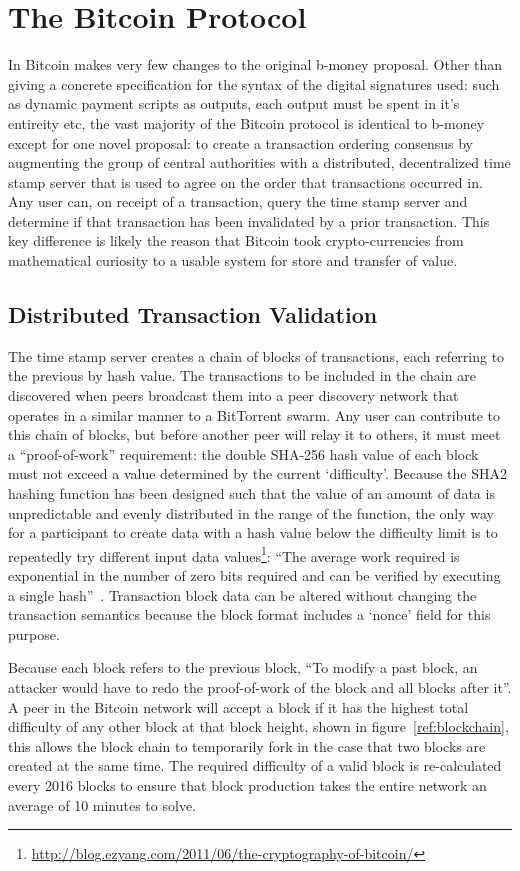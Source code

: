 \section{The Bitcoin Protocol}
In Bitcoin \textcite{satoshi} makes very few changes to the original b-money\cite{b-money} proposal. Other than giving a concrete specification for the syntax of the digital signatures  used: such as dynamic payment scripts as outputs, each output must be spent in it's entireity etc, the vast majority of the Bitcoin protocol is identical to b-money except for one novel proposal: to create a transaction ordering consensus by augmenting the group of central authorities with a distributed, decentralized time stamp server that is used to agree on the order that transactions occurred in.  Any user can, on receipt of a transaction, query the time stamp server and determine if that transaction has been invalidated by a prior transaction. This key difference is likely the reason that Bitcoin took crypto-currencies from mathematical curiosity to a usable system for store and transfer of value.

\subsection{Distributed Transaction Validation}
The time stamp server creates a chain of blocks of transactions, each referring to the previous by hash value.  The transactions to be included in the chain are discovered when peers broadcast them into a peer discovery network that operates in a similar manner to a BitTorrent swarm.  Any user can contribute to this chain of blocks, but before another peer will relay it to others, it must meet a ``proof-of-work'' requirement: the double SHA-256 hash value of each block must not exceed a value determined by the current `difficulty'.  Because the SHA2 hashing function has been designed such that the value of an amount of data is unpredictable and evenly distributed in the range of the function, the only way for a participant to create data with a hash value below the difficulty limit is to repeatedly try different input data values\footnote{\url{http://blog.ezyang.com/2011/06/the-cryptography-of-bitcoin/}}: ``The average work required is exponential in the number of zero bits required and can be verified by executing a single hash''~\cite{satoshi}. Transaction block data can be altered without changing the transaction semantics because the block format includes a `nonce' field for this purpose.

Because each block refers to the previous block, ``To modify a past block, an attacker would have to redo the proof-of-work of the block and all blocks after it''.  A peer in the Bitcoin network will accept a block if it has the highest total difficulty of any other block at that block height, shown in figure~\ref{ref:blockchain}, this allows the block chain to temporarily fork in the case that two blocks are created at the same time. The required difficulty of a valid block is re-calculated every 2016 blocks to ensure that block production takes the entire network an average of 10 minutes to solve.

